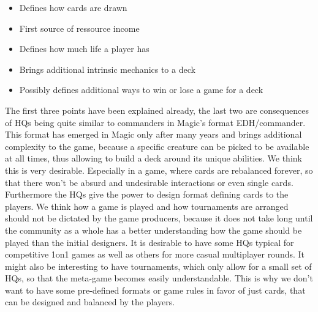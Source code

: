 \documentclass{article}
\begin{document}
%
\begin{itemize}
	\item Defines how cards are drawn
	\item First source of ressource income
	\item Defines how much life a player has
	\item Brings additional intrinsic mechanics to a deck
	\item Possibly defines additional ways to win or lose a game for a deck
\end{itemize} 
%
The first three points have been explained already, the last two are consequences of HQs being quite similar to commanders in Magic's format EDH/commander. This format has emerged in Magic only after many years and brings additional complexity to the game, because a specific creature can be picked to be available at all times, thus allowing to build a deck around its unique abilities. We think this is very desirable. Especially in a game, where cards are rebalanced forever, so that there won't be absurd and undesirable interactions or even single cards. Furthermore the HQs give the power to design format defining cards to the players. We think how a game is played and how tournaments are arranged should not be dictated by the game producers, because it does not take long until the community as a whole has a better understanding how the game should be played than the initial designers. It is desirable to have some HQs typical for competitive 1on1 games as well as others for more casual multiplayer rounds. It might also be interesting to have tournaments, which only allow for a small set of HQs, so that the meta-game becomes easily understandable. This is why we don't want to have some pre-defined formats or game rules in favor of just cards, that can be designed and balanced by the players.
%
\end{document}
